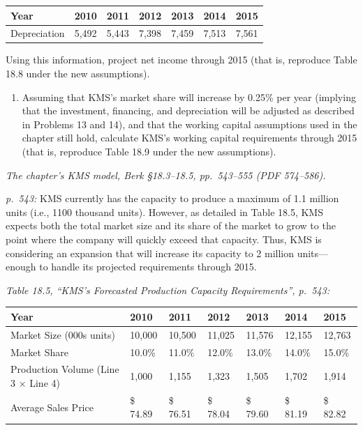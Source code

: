 \documentclass[11pt,a4paper]{article}
\providecommand{\tightlist}{\setlength{\itemsep}{0pt}\setlength{\parskip}{0pt}}
\begin{document}
{\def\LTcaptype{none} %
\begin{longtable}[]{@{}lllllll@{}}
\toprule\noalign{}
Year & 2010 & 2011 & 2012 & 2013 & 2014 & 2015 \\
\midrule\noalign{}
\endhead
\bottomrule\noalign{}
\endlastfoot
Depreciation & 5,492 & 5,443 & 7,398 & 7,459 & 7,513 & 7,561 \\
\end{longtable}
}

Using this information, project net income through 2015 (that is, reproduce Table 18.8 under the new
assumptions).

\begin{enumerate}
\def\labelenumi{\arabic{enumi}.}
\setcounter{enumi}{14}
\tightlist
\item
  Assuming that KMS's market share will increase by 0.25\% per year (implying that the investment,
  financing, and depreciation will be adjusted as described in Problems 13 and 14), and that the
  working capital assumptions used in the chapter still hold, calculate KMS's working capital
  requirements through 2015 (that is, reproduce Table 18.9 under the new assumptions).
\end{enumerate}

\emph{The chapter's KMS model, Berk §18.3--18.5, pp.~543--555 (PDF 574--586).}

\emph{p.~543:} KMS currently has the capacity to produce a maximum of 1.1 million units (i.e., 1100
thousand units). However, as detailed in Table 18.5, KMS expects both the total market size and its
share of the market to grow to the point where the company will quickly exceed that capacity. Thus,
KMS is considering an expansion that will increase its capacity to 2 million units---enough to
handle its projected requirements through 2015.

\emph{Table 18.5, ``KMS's Forecasted Production Capacity Requirements'', p.~543:}

{\def\LTcaptype{none} %
\begin{longtable}[]{@{}lllllll@{}}
\toprule\noalign{}
Year & 2010 & 2011 & 2012 & 2013 & 2014 & 2015 \\
\midrule\noalign{}
\endhead
\bottomrule\noalign{}
\endlastfoot
Market Size (000s units) & 10,000 & 10,500 & 11,025 & 11,576 & 12,155 & 12,763 \\
Market Share & 10.0\% & 11.0\% & 12.0\% & 13.0\% & 14.0\% & 15.0\% \\
Production Volume (Line 3 × Line 4) & 1,000 & 1,155 & 1,323 & 1,505 & 1,702 & 1,914 \\
Average Sales Price & \$ 74.89 & \$ 76.51 & \$ 78.04 & \$ 79.60 & \$ 81.19 & \$ 82.82 \\
\end{longtable}
}
\end{document}
